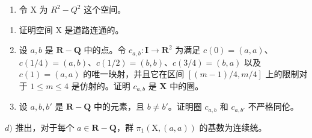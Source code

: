 \begin{enumerate}
\def\labelenumi{\arabic{enumi})}
\setcounter{enumi}{5}
\tightlist
\item
令 X 为 \(R^{2}-Q^{2}\) 这个空间。
\end{enumerate}

\begin{enumerate}
\def\labelenumi{\alph{enumi})}
\item
证明空间 X 是道路连通的。
\item
设 \(a, b\) 是 \(\mathbf{R} - \mathbf{Q}\) 中的点。令 \(c_{a,b}: \mathbf{I} \to \mathbf{R}^2\) 为满足 \(c(0) = (a, a)\)、\(c(1/4) = (a, b)\)、\(c(1/2) = (b, b)\)、\(c(3/4) = (b, a)\) 以及 \(c(1) = (a, a)\) 的唯一映射，并且它在区间 \([(m-1)/4, m/4]\) 上的限制对于 \(1 \leqslant m \leqslant 4\) 是仿射的。证明 \(c_{a,b}\) 是 \(\mathbf{X}\) 中的圈。
\item
设 \(a, b, b'\) 是 \(\mathbf{R} - \mathbf{Q}\) 中的元素，且 \(b \neq b'\)。证明圈 \(c_{a,b}\) 和 \(c_{a,b'}\) 不严格同伦。
\end{enumerate}

\(d)\) 推出，对于每个 \(a \in \mathbf{R} - \mathbf{Q}\)，群 \(\pi_1(\mathrm{X}, (a, a))\) 的基数为连续统。
